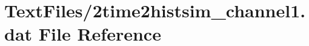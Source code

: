\hypertarget{2time2histsim__channel1_8dat}{}\section{Text\+Files/2time2histsim\+\_\+channel1.dat File Reference}
\label{2time2histsim__channel1_8dat}

